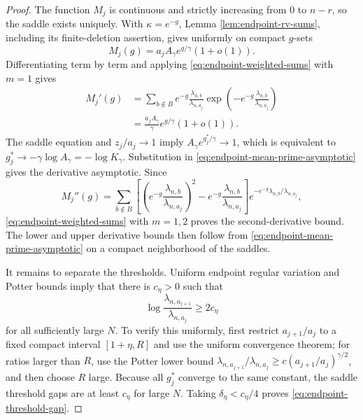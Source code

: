 \documentclass[11pt]{article}
\theoremstyle{remark}
\begin{document}
\begin{proof}
The function \(M_j\) is continuous and strictly increasing from \(0\) to
\(n-r\), so the saddle exists uniquely.  With \(\kappa=e^{-g}\), Lemma
\ref{lem:endpoint-rv-sums}, including its finite-deletion assertion, gives
uniformly on compact \(g\)-sets
\[
        M_j(g)=a_jA_\gamma e^{g/\gamma}(1+o(1)).
\tag{8.9}\label{eq:endpoint-mean-asymptotic}
\]
Differentiating term by term and applying
\eqref{eq:endpoint-weighted-sums} with \(m=1\) gives
\[
\begin{aligned}
        M_j'(g)
        &=\sum_{b\notin B}e^{-g}
        \frac{\lambda_{n,b}}{\lambda_{n,a_j}}
        \exp\left(-e^{-g}
        \frac{\lambda_{n,b}}{\lambda_{n,a_j}}\right)\\
        &=\frac{a_jA_\gamma}{\gamma}e^{g/\gamma}(1+o(1)).
\end{aligned}
\tag{8.10}\label{eq:endpoint-mean-prime-asymptotic}
\]
The saddle equation and \(z_j/a_j\to1\) imply
\(A_\gamma e^{g_j^*/\gamma}\to1\), which is equivalent to
\(g_j^*\to-\gamma\log A_\gamma=-\log K_\gamma\).  Substitution in
\eqref{eq:endpoint-mean-prime-asymptotic} gives the derivative asymptotic.
Since
\[
        M_j''(g)=\sum_{b\notin B}
        \left[
        \left(e^{-g}\frac{\lambda_{n,b}}{\lambda_{n,a_j}}\right)^2
        -e^{-g}\frac{\lambda_{n,b}}{\lambda_{n,a_j}}
        \right]
        e^{-e^{-g}\lambda_{n,b}/\lambda_{n,a_j}},
\]
\eqref{eq:endpoint-weighted-sums} with \(m=1,2\) proves the second-derivative
bound.  The lower and upper derivative bounds then follow from
\eqref{eq:endpoint-mean-prime-asymptotic} on a compact neighborhood of the
saddles.

It remains to separate the thresholds.  Uniform endpoint regular variation and
Potter bounds imply that there is \(c_\eta>0\) such that
\[
        \log\frac{\lambda_{n,a_{j+1}}}{\lambda_{n,a_j}}
        \ge2c_\eta
\tag{8.11}\label{eq:endpoint-rate-gap}
\]
for all sufficiently large \(N\).  To verify this uniformly, first restrict
\(a_{j+1}/a_j\) to a fixed compact interval
\([1+\eta,R]\) and use the uniform convergence theorem; for ratios larger
than \(R\), use the Potter lower bound
\(\lambda_{n,a_{j+1}}/\lambda_{n,a_j}
\ge c(a_{j+1}/a_j)^{\gamma/2}\), and then choose \(R\) large.
Because all \(g_j^*\) converge to the same constant, the saddle threshold gaps
are at least \(c_\eta\) for large \(N\).  Taking
\(\delta_\eta<c_\eta/4\) proves \eqref{eq:endpoint-threshold-gap}.
\end{proof}
\end{document}
